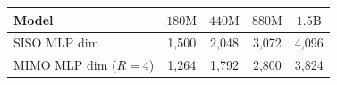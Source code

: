 \begin{table}[h]
    \centering
    \begin{tabular}{lcccc}
        \toprule
        \textbf{Model}& $180\text{M}$ & $440\text{M}$ & $880\text{M}$ & $1.5\text{B}$ \\
        \midrule
        SISO MLP dim & 1,500 & 2,048 & 3,072 & 4,096 \\
        MIMO MLP dim ($R=4$) & 1,264 & 1,792 & 2,800 & 3,824 \\
        \bottomrule
    \end{tabular}
\end{table}
